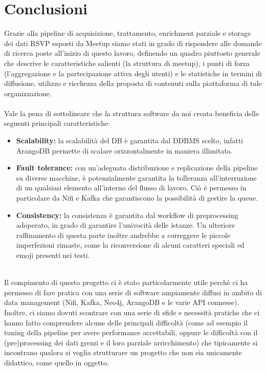 \documentclass[fleqn,10pt]{SelfArx} %
\begin{document}
{\section{Conclusioni}
Grazie alla pipeline di acquisizione, trattamento, enrichment parziale e storage dei dati RSVP esposti da Meetup siamo stati in grado di rispondere alle domande di ricerca poste all'inizio di questo lavoro, definendo un quadro piuttosto generale che descrive le caratteristiche salienti (la struttura di meetup), i punti di forza (l'aggregazione e la partecipazione attiva degli utenti) e le statistiche in termini di diffusione, utilizzo e ricchezza della proposta di contenuti sulla piattaforma di tale organizzazione. \\
\\
Vale la pena di sottolineare che la struttura software da noi creata beneficia delle seguenti principali caratteristiche:
\begin{itemize}
\item \textbf{Scalability:} la scalabilità del DB è garantita dal DDBMS scelto, infatti ArangoDB permette di scalare orizzontalmente in maniera illimitata.
\item \textbf{Fault tolerance:} con un'adeguata distribuzione e replicazione della pipeline su diverse macchine, è potenzialmente garantita la tolleranza all'interruzione di un qualsiasi elemento all'interno del flusso di lavoro. Ciò è permesso in particolare da Nifi e Kafka che garantiscono la possibilità di gestire la queue.
\item \textbf{Consistency:} la consistenza è garantita dal workflow di preprocessing adoperato, in grado di garantire l'univocità delle istanze. Un ulteriore raffinamento di questa parte inoltre andrebbe a correggere le piccole imperfezioni rimaste, come la riconversione di alcuni caratteri speciali ed emoji presenti nei testi.
\end{itemize}
$~$\\
Il compimento di questo progetto ci è stato particolarmente utile perchè ci ha permesso di fare pratica con una serie di software ampiamente diffusi in ambito di data management (Nifi, Kafka, Neo4j, ArangoDB e le varie API connesse). 
\\
Inoltre, ci siamo dovuti scontrare con una serie di sfide e necessità pratiche che ci hanno fatto comprendere alcune delle principali difficoltà (come ad esempio il tuning della pipeline per avere performance accettabili, oppure le difficoltà con il (pre)processing dei dati grezzi e il loro parziale arricchimento) che tipicamente si incontrano qualora si voglia strutturare un progetto che non sia unicamente didattico, come quello in oggetto.
}
\end{document}
